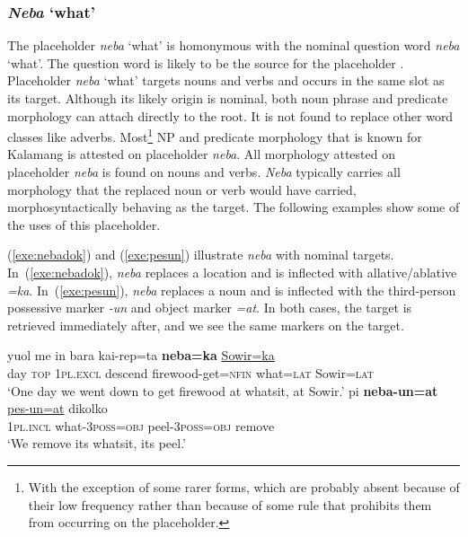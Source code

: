 \documentclass[output=paper,colorlinks,citecolor=brown
\ChapterDOI{10.5281/zenodo.15697587}
]{langscibook}
\begin{document}

\subsubsection{\textit{Neba} `what'}
The placeholder \textit{neba} `what' is homonymous with the nominal question word \textit{neba} `what'. The question word is likely to be the source for the placeholder \parencite[][12]{podlesskaya2010}. Placeholder \textit{neba} `what' targets nouns and verbs and occurs in the same slot as its target. Although its likely origin is nominal, both noun phrase and predicate morphology can attach directly to the root. It is not found to replace other word classes like adverbs. Most\footnote{With the exception of some rarer forms, which are probably absent because of their low frequency rather than because of some rule that prohibits them from occurring on the placeholder.} NP and predicate morphology that is known for Kalamang is attested on placeholder \textit{neba}. All morphology attested on placeholder \textit{neba} is found on nouns and verbs. \textit{Neba} typically carries all morphology that the replaced noun or verb would have carried, morphosyntactically behaving as the target. The following examples show some of the uses of this placeholder. 


(\ref{exe:nebadok}) and (\ref{exe:pesun}) illustrate \textit{neba} with nominal targets. In~(\ref{exe:nebadok}), \textit{neba} replaces a location and is inflected with allative/ablative \textit{=ka}. In~(\ref{exe:pesun}), \textit{neba} replaces a noun and is inflected with the third-person possessive marker \textit{-un} and object marker \textit{=at}. In both cases, the target is retrieved immediately after, and we see the same markers on the target.

\begin{exe}
    \ex \gll yuol me in bara kai-rep=ta \textbf{neba=ka} \uline{Sowir=ka}\\
    day \textsc{top} \textsc{1pl.excl} descend firewood-get=\textsc{nfin} what=\textsc{lat} Sowir=\textsc{lat}\\
    \glt `One day we went down to get firewood at whatsit, at Sowir.'
    \label{exe:nebadok}
    \ex \gll pi \textbf{neba-un=at} \uline{pes-un=at} dikolko\\
    \textsc{1pl.incl} what-\textsc{3poss=obj} peel-\textsc{3poss=obj} remove\\
    \glt `We remove its whatsit, its peel.' 
    \label{exe:pesun}
\end{exe}
\end{document}

